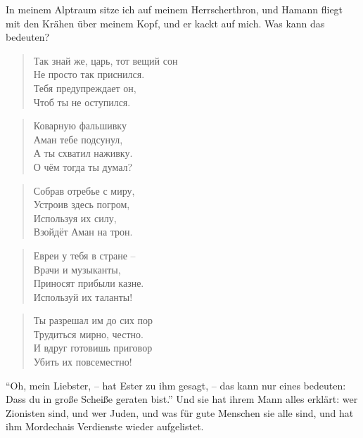 \documentclass[12pt,a4paper,titlepage]{article}
\begin{document}
\begin{drama}
\uespeaks
In meinem Alptraum sitze ich auf meinem Herrscherthron, und Hamann fliegt
mit den Krähen über meinem Kopf, und er kackt auf mich. Was kann das bedeuten?

\espeaks {}
\begin{verse}
Так знай же, царь, тот вещий сон\\
Не просто так приснился.\\
Тебя предупреждает он,\\
Чтоб ты не оступился.\\
\end{verse}

\begin{verse}
Коварную фальшивку\\
Аман тебе подсунул,\\
А ты схватил наживку.\\
О чём тогда ты думал?\\
\end{verse}

\begin{verse}
Собрав отребье с миру,\\
Устроив здесь погром,\\
Используя их силу,\\
Взойдёт Аман на трон.\\
\end{verse}

\begin{verse}
Евреи у тебя в стране --\\
Врачи и музыканты,\\
Приносят прибыли казне.\\
Используй их таланты!\\
\end{verse}

\begin{verse}
Ты разрешал им до сих пор\\
Трудиться мирно, честно.\\
И вдруг готовишь приговор\\
Убить их повсеместно!\\
\end{verse}


\uespeaks
"`Oh, mein Liebster, -- hat Ester zu ihm gesagt, -- das kann nur eines bedeuten:
Dass du in große Scheiße geraten bist."' Und sie hat ihrem Mann alles erklärt:
wer Zionisten sind, und wer Juden, und was für gute Menschen sie alle sind,
und hat ihm Mordechais Verdienste wieder aufgelistet.



\end{drama}
\end{document}
